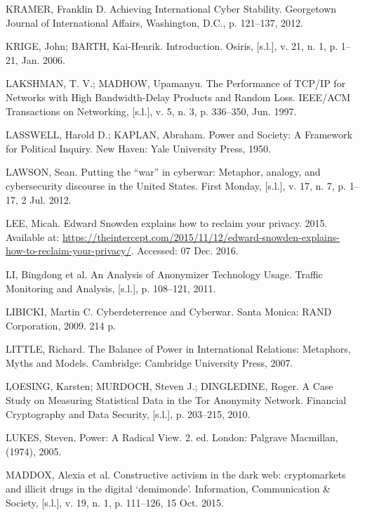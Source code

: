 \begin{list}{}{\setlength{\leftmargin}{0pt}\setlength{\itemsep}{6pt}\setlength{\parsep}{0pt}}
\item KRAMER, Franklin D. Achieving International Cyber Stability. Georgetown Journal of International Affairs, Washington, D.C., p. 121--137, 2012.

\item KRIGE, John; BARTH, Kai-Henrik. Introduction. Osiris, [s.l.], v. 21, n. 1, p. 1--21, Jan. 2006.

\item LAKSHMAN, T. V.; MADHOW, Upamanyu. The Performance of TCP/IP for Networks with High Bandwidth-Delay Products and Random Loss. IEEE/ACM Transactions on Networking, [s.l.], v. 5, n. 3, p. 336--350, Jun. 1997.

\item LASSWELL, Harold D.; KAPLAN, Abraham. Power and Society: A Framework for Political Inquiry. New Haven: Yale University Press, 1950.

\item LAWSON, Sean. Putting the ``war'' in cyberwar: Metaphor, analogy, and cybersecurity discourse in the United States. First Monday, [s.l.], v. 17, n. 7, p. 1--17, 2 Jul. 2012.

\item LEE, Micah. Edward Snowden explains how to reclaim your privacy. 2015. Available at: \url{https://theintercept.com/2015/11/12/edward-snowden-explains-how-to-reclaim-your-privacy/}. Accessed: 07 Dec. 2016.

\item LI, Bingdong et al. An Analysis of Anonymizer Technology Usage. Traffic Monitoring and Analysis, [s.l.], p. 108--121, 2011.

\item LIBICKI, Martin C. Cyberdeterrence and Cyberwar. Santa Monica: RAND Corporation, 2009. 214 p.

\item LITTLE, Richard. The Balance of Power in International Relations: Metaphors, Myths and Models. Cambridge: Cambridge University Press, 2007.

\item LOESING, Karsten; MURDOCH, Steven J.; DINGLEDINE, Roger. A Case Study on Measuring Statistical Data in the Tor Anonymity Network. Financial Cryptography and Data Security, [s.l.], p. 203--215, 2010.

\item LUKES, Steven. Power: A Radical View. 2. ed. London: Palgrave Macmillan, (1974), 2005.

\item MADDOX, Alexia et al. Constructive activism in the dark web: cryptomarkets and illicit drugs in the digital `demimonde'. Information, Communication \& Society, [s.l.], v. 19, n. 1, p. 111--126, 15 Oct. 2015.


\end{list}
